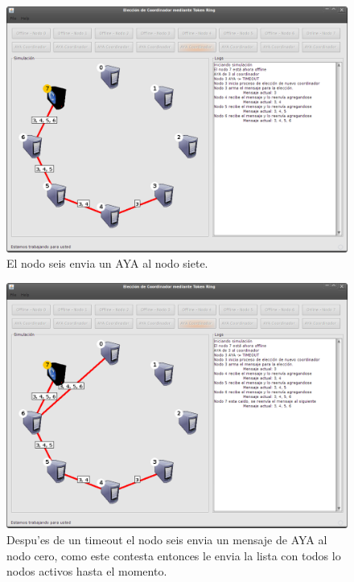 \begin{figure}
\centering
 \includegraphics[scale=0.4,keepaspectratio=true]{./imagenes/tokenRing/token3.png}
 \caption{El nodo seis envia un AYA al nodo siete.}
\end{figure}

\begin{figure}
\centering
 \includegraphics[scale=0.4,keepaspectratio=true]{./imagenes/tokenRing/token4.png}
 \caption{Despu'es de un timeout el nodo seis envia un mensaje de AYA al nodo cero, como este contesta entonces le envia la lista con todos lo nodos activos hasta el momento.}
\end{figure}

